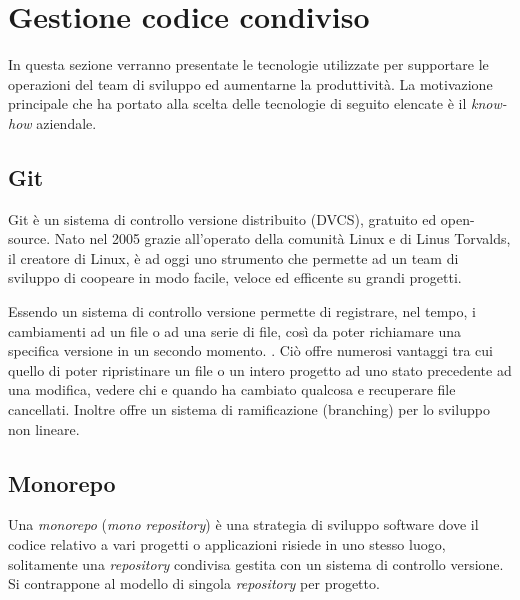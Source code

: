 \section{Gestione codice condiviso}
In questa sezione verranno presentate le tecnologie utilizzate per supportare le operazioni
del team di sviluppo ed aumentarne la produttività.
La motivazione principale che ha portato alla scelta delle tecnologie di seguito elencate è il \textit{know-how} aziendale.

\subsection{Git}
Git \cite{Git} è un sistema di controllo versione distribuito (DVCS), gratuito ed open-source.
Nato nel 2005 grazie all'operato della comunità Linux e di Linus Torvalds, il creatore di Linux, è ad oggi uno strumento che
permette ad un team di sviluppo di coopeare in modo facile, veloce ed efficente su grandi progetti.

Essendo un sistema di controllo versione permette di registrare, nel tempo, i cambiamenti ad un file o ad una serie di file,
così da poter richiamare una specifica versione in un secondo momento. \cite{GitPro}.
Ciò offre numerosi vantaggi tra cui quello di poter ripristinare un file o un intero progetto ad uno stato precedente ad una modifica,
vedere chi e quando ha cambiato qualcosa e recuperare file cancellati.
Inoltre offre un sistema di ramificazione (branching) per lo sviluppo non lineare.


\subsection{Monorepo}
Una \textit{monorepo}\cite{Google-Monorepo} (\textit{mono repository}) è una strategia di sviluppo software dove il codice
relativo a vari progetti o applicazioni risiede in uno stesso luogo, solitamente una \textit{repository} condivisa
gestita con un sistema di controllo versione.
Si contrappone al modello di singola \textit{repository} per progetto.

